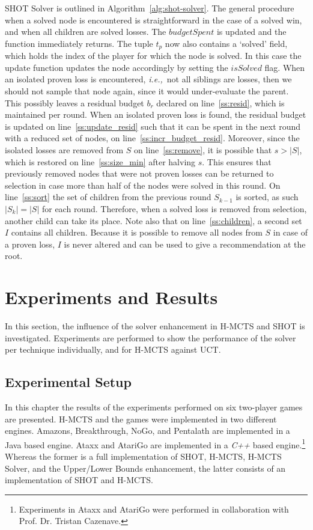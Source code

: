 \documentclass{icga}
\newcommand{\ie}{{\it i.e.,}~}
\newcommand{\func}[1]{{\sc #1}}
\begin{document}
SHOT Solver is outlined in Algorithm~\ref{alg:shot-solver}. The general procedure when a solved node is encountered is straightforward in the case of a solved win, and when all children are solved losses. The $budgetSpent$ is updated and the function immediately returns. The tuple $t_p$ now also contains a `solved' field, which holds the index of the player for which the node is solved. In this case the \func{update} function updates the node accordingly by setting the $isSolved$ flag. When an isolated proven loss is encountered, \ie not all siblings are losses, then we should not sample that node again, since it would under-evaluate the parent. This possibly leaves a residual budget $b_r$ declared on line~\ref{ss:resid}, which is maintained per round. When an isolated proven loss is found, the residual budget is updated on line~\ref{ss:update_resid} such that it can be spent in the next round with a reduced set of nodes, on line~\ref{ss:incr_budget_resid}. Moreover, since the isolated losses are removed from $S$ on line~\ref{ss:remove}, it is possible that $s > |S|$, which is restored on line~\ref{ss:size_min} after halving $s$. This ensures that previously removed nodes that were not proven losses can be returned to selection in case more than half of the nodes were solved in this round. On line~\ref{ss:sort} the set of children from the previous round $S_{k-1}$ is sorted, as such $|S_k| = |S|$ for each round. Therefore, when a solved loss is removed from selection, another child can take its place. Note also that on line~\ref{ss:children}, a second set $I$ contains all children. Because it is possible to remove all nodes from $S$ in case of a proven loss, $I$ is never altered and can be used to give a recommendation at the root.

\section{Experiments and Results}
\label{sec:experiments}
In this section, the influence of the solver enhancement in H-MCTS and SHOT is investigated. Experiments are performed to show the performance of the solver per technique individually, and for H-MCTS against UCT.

\subsection{Experimental Setup}
\label{subsec:ex_setup}
In this chapter the results of the experiments performed on six two-player games are presented. H-MCTS and the games were implemented in two different engines. Amazons, Breakthrough, NoGo, and Pentalath are implemented in a Java based engine. Ataxx and AtariGo are implemented in a \emph{C++} based engine.\footnote{Experiments in Ataxx and AtariGo were performed in collaboration with Prof. Dr. Tristan Cazenave.} Whereas the former is a full implementation of SHOT, H-MCTS, H-MCTS Solver, and the Upper/Lower Bounds enhancement, the latter consists of an implementation of SHOT and H-MCTS.
\end{document}
